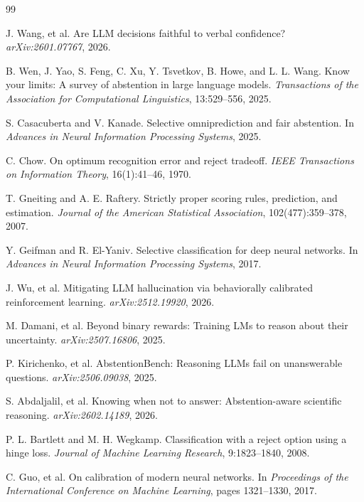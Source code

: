 \documentclass[letterpaper,10pt,twocolumn]{article}
\begin{document}
\begin{thebibliography}{99}

J. Wang, et al.
Are LLM decisions faithful to verbal confidence?
\textit{arXiv:2601.07767}, 2026.

B. Wen, J. Yao, S. Feng, C. Xu, Y. Tsvetkov, B. Howe, and L. L. Wang.
Know your limits: A survey of abstention in large language models.
\textit{Transactions of the Association for Computational Linguistics},
13:529--556, 2025.

S. Casacuberta and V. Kanade.
Selective omniprediction and fair abstention.
In \textit{Advances in Neural Information Processing Systems}, 2025.

C. Chow.
On optimum recognition error and reject tradeoff.
\textit{IEEE Transactions on Information Theory}, 16(1):41--46, 1970.

T. Gneiting and A. E. Raftery.
Strictly proper scoring rules, prediction, and estimation.
\textit{Journal of the American Statistical Association}, 102(477):359--378,
2007.

Y. Geifman and R. El-Yaniv.
Selective classification for deep neural networks.
In \textit{Advances in Neural Information Processing Systems}, 2017.

J. Wu, et al.
Mitigating LLM hallucination via behaviorally calibrated reinforcement
learning.
\textit{arXiv:2512.19920}, 2026.

M. Damani, et al.
Beyond binary rewards: Training LMs to reason about their uncertainty.
\textit{arXiv:2507.16806}, 2025.

P. Kirichenko, et al.
AbstentionBench: Reasoning LLMs fail on unanswerable questions.
\textit{arXiv:2506.09038}, 2025.

S. Abdaljalil, et al.
Knowing when not to answer: Abstention-aware scientific reasoning.
\textit{arXiv:2602.14189}, 2026.

P. L. Bartlett and M. H. Wegkamp.
Classification with a reject option using a hinge loss.
\textit{Journal of Machine Learning Research}, 9:1823--1840, 2008.

C. Guo, et al.
On calibration of modern neural networks.
In \textit{Proceedings of the International Conference on Machine Learning},
pages 1321--1330, 2017.


\end{thebibliography}
\end{document}

